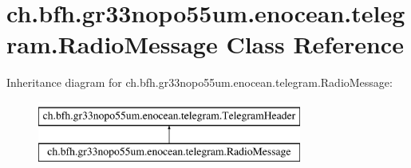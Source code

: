 \hypertarget{classch_1_1bfh_1_1gr33nopo55um_1_1enocean_1_1telegram_1_1_radio_message}{}\section{ch.\+bfh.\+gr33nopo55um.\+enocean.\+telegram.\+Radio\+Message Class Reference}
\label{classch_1_1bfh_1_1gr33nopo55um_1_1enocean_1_1telegram_1_1_radio_message}
Inheritance diagram for ch.\+bfh.\+gr33nopo55um.\+enocean.\+telegram.\+Radio\+Message\+:\begin{figure}[H]
\begin{center}
\leavevmode
\includegraphics[height=2.000000cm]{classch_1_1bfh_1_1gr33nopo55um_1_1enocean_1_1telegram_1_1_radio_message}
\end{center}
\end{figure}
